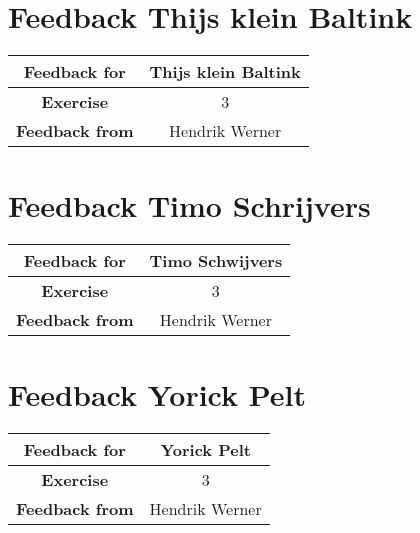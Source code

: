 \documentclass[12pt, a4paper]{article}
\begin{document}
\clearpage
\section{Feedback Thijs klein Baltink}
\begin{tabular}{|c|c|}
	\hline
	\textbf{Feedback for} & Thijs klein Baltink\\\hline
	\textbf{Exercise} & 3\\\hline
	\textbf{Feedback from} & Hendrik Werner\\\hline
\end{tabular}

\clearpage
\section{Feedback Timo Schrijvers}
\begin{tabular}{|c|c|}
	\hline
	\textbf{Feedback for} & Timo Schwijvers\\\hline
	\textbf{Exercise} & 3\\\hline
	\textbf{Feedback from} & Hendrik Werner\\\hline
\end{tabular}

\clearpage
\section{Feedback Yorick Pelt}
\begin{tabular}{|c|c|}
	\hline
	\textbf{Feedback for} & Yorick Pelt\\\hline
	\textbf{Exercise} & 3\\\hline
	\textbf{Feedback from} & Hendrik Werner\\\hline
\end{tabular}
\end{document}
